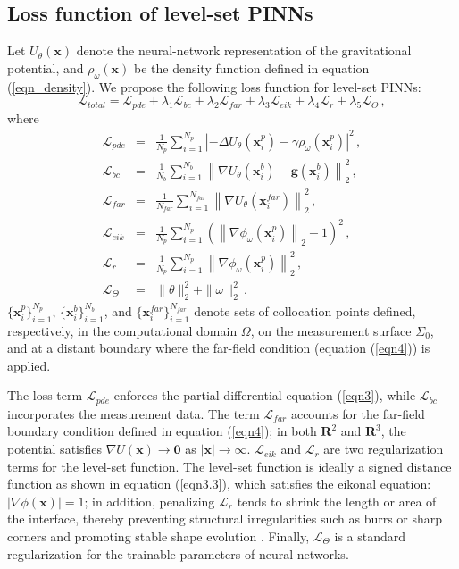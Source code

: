 \documentclass[final,hidelinks,onefignum,onetabnum]{siamart251216}
\begin{document}
\subsection{Loss function of level-set PINNs}\label{subsec_loss}
Let $U_\theta(\mathbf{x})$ denote the neural-network representation of the gravitational potential, and $\rho_\omega(\mathbf{x})$ be the density function defined in equation (\ref{eqn_density}). We propose the following loss function for level-set PINNs:
\begin{equation}
\mathcal{L}_{total}=\mathcal{L}_{pde}+\lambda_1\mathcal{L}_{bc}+\lambda_2\mathcal{L}_{far}+\lambda_3\mathcal{L}_{eik}+\lambda_4\mathcal{L}_r+\lambda_5\mathcal{L}_{\Theta}\,,
\end{equation}
where
\begin{eqnarray}
\mathcal{L}_{pde}&=& \frac{1}{N_p} \sum_{i=1}^{N_p} \left| -\Delta U_{\theta}(\mathbf{x}_i^p) - \gamma \rho_{\omega}(\mathbf{x}_i^p) \right|^2\,,  \label{eqn3.7} \\
\mathcal{L}_{bc}&=& \frac{1}{N_b} \sum_{i=1}^{N_b} \left\| \nabla U_{\theta}(\mathbf{x}_i^b) - \mathbf{g}(\mathbf{x}_i^b) \right\|_2^2\,, \\
\mathcal{L}_{far}&=& \frac{1}{N_{far}} \sum_{i=1}^{N_{far}} \left\| \nabla U_{\theta}(\mathbf{x}_i^{far}) \right\|_2^2\,, \\
\mathcal{L}_{eik}&=& \frac{1}{N_p} \sum_{i=1}^{N_p} \left( \left\| \nabla \phi_{\omega}(\mathbf{x}_i^p) \right\|_2 - 1 \right)^2\,, \\
\mathcal{L}_r&=& \frac{1}{N_p} \sum_{i=1}^{N_p} \left\| \nabla \phi_{\omega}(\mathbf{x}_i^p) \right\|_2^2 \,, \\
\mathcal{L}_{\Theta}&=& \|\theta\|_2^2+\|\omega\|_2^2\,.
\end{eqnarray}
$\big\{\mathbf{x}_i^p\big\}_{i=1}^{N_p}$, $\big\{\mathbf{x}_i^b\big\}_{i=1}^{N_b}$, and $\big\{\mathbf{x}_i^{far}\big\}_{i=1}^{N_{far}}$ denote sets of collocation points defined, respectively, in the computational domain $\Omega$, on the measurement surface $\Sigma_0$, and at a distant boundary where the far-field condition (equation (\ref{eqn4})) is applied.

The loss term $\mathcal{L}_{pde}$ enforces the partial differential equation (\ref{eqn3}), while $\mathcal{L}_{bc}$ incorporates the measurement data. The term $\mathcal{L}_{far}$ accounts for the far-field boundary condition defined in equation (\ref{eqn4}); in both $\mathbf{R}^2$ and $\mathbf{R}^3$, the potential satisfies $\nabla U(\mathbf{x})\to\mathbf{0}$ as $|\mathbf{x}|\to\infty$. $\mathcal{L}_{eik}$ and $\mathcal{L}_r$ are two regularization terms for the level-set function. The level-set function is ideally a signed distance function as shown in equation (\ref{eqn3.3}), which satisfies the eikonal equation: $|\nabla\phi(\mathbf{x})|=1$; in addition, penalizing $\mathcal{L}_r$ tends to shrink the length or area of the interface, thereby preventing structural irregularities such as burrs or sharp corners and promoting stable shape evolution \cite{denzhalima25,liqia21}. Finally, $\mathcal{L}_{\Theta}$ is a standard regularization for the trainable parameters of neural networks.
\end{document}
